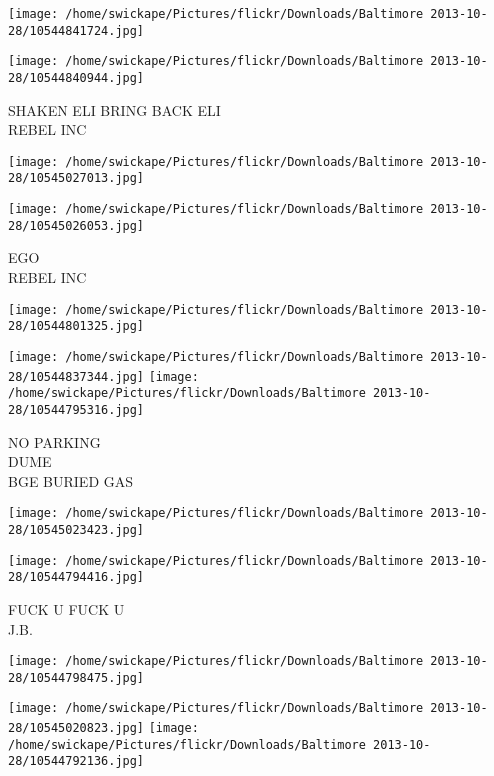 \documentclass[10pt,letterpaper]{article}
\begin{document}
\texttt{[image: /home/swickape/Pictures/flickr/Downloads/Baltimore 2013-10-28/10544841724.jpg]}

\vspace{0.25in}
\texttt{[image: /home/swickape/Pictures/flickr/Downloads/Baltimore 2013-10-28/10544840944.jpg]}

SHAKEN ELI BRING BACK ELI\\
REBEL INC\\
\pagebreak

\texttt{[image: /home/swickape/Pictures/flickr/Downloads/Baltimore 2013-10-28/10545027013.jpg]}

\vspace{0.25in}
\texttt{[image: /home/swickape/Pictures/flickr/Downloads/Baltimore 2013-10-28/10545026053.jpg]}

EGO\\
REBEL INC\\
\pagebreak

\texttt{[image: /home/swickape/Pictures/flickr/Downloads/Baltimore 2013-10-28/10544801325.jpg]}

\vspace{0.25in}
\texttt{[image: /home/swickape/Pictures/flickr/Downloads/Baltimore 2013-10-28/10544837344.jpg]}
\texttt{[image: /home/swickape/Pictures/flickr/Downloads/Baltimore 2013-10-28/10544795316.jpg]}

NO PARKING\\
DUME\\
BGE BURIED GAS\\
\pagebreak

\texttt{[image: /home/swickape/Pictures/flickr/Downloads/Baltimore 2013-10-28/10545023423.jpg]}

\vspace{0.25in}
\texttt{[image: /home/swickape/Pictures/flickr/Downloads/Baltimore 2013-10-28/10544794416.jpg]}

FUCK U FUCK U\\
J.B.\\
\pagebreak

\texttt{[image: /home/swickape/Pictures/flickr/Downloads/Baltimore 2013-10-28/10544798475.jpg]}

\vspace{0.25in}
\texttt{[image: /home/swickape/Pictures/flickr/Downloads/Baltimore 2013-10-28/10545020823.jpg]}
\texttt{[image: /home/swickape/Pictures/flickr/Downloads/Baltimore 2013-10-28/10544792136.jpg]}
\end{document}
